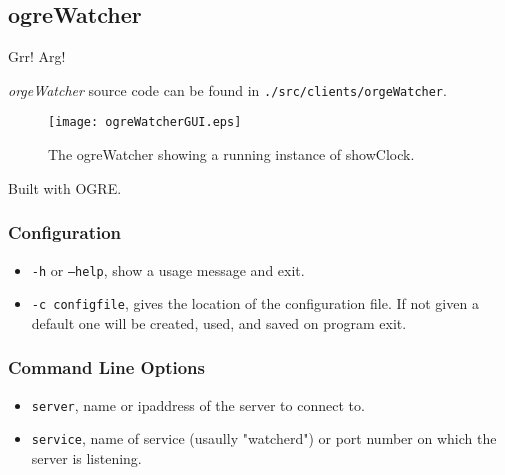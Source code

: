 
\subsection{ogreWatcher}

Grr! Arg!

{\it orgeWatcher} source code can be found in {\tt .\slash src\slash clients\slash orgeWatcher}. 

\begin{figure}
\centering
\texttt{[image: ogreWatcherGUI.eps]}
\caption{The ogreWatcher showing a running instance of showClock.}
\label{ogreWatcher}
\end{figure}

Built with OGRE.

\subsubsection{Configuration}

\begin{itemize}
\item {\tt -h} or {\tt --help}, show a usage message and exit. 
\item {\tt -c configfile}, gives the location of the configuration file. If not given a default one will be created, used, and saved on program exit.
\end{itemize}

\subsubsection{Command Line Options}

\begin{itemize}
\item {\tt server}, name or ipaddress of the server to connect to.
\item {\tt service}, name of service (usaully "watcherd") or port number on which the server is listening.
\end{itemize}
